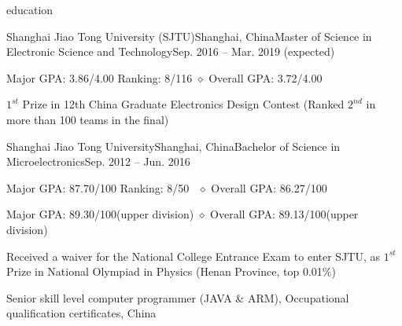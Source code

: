 \documentclass{resume_ucla} %
\begin{document}

\begin{rSection}{education}
\begin{rSubsection}{Shanghai Jiao Tong University (SJTU)}{Shanghai, China}{Master of Science in Electronic Science and Technology}{Sep. 2016 -- Mar. 2019 (expected)}
\item Major GPA: 3.86/4.00 \qquad Ranking: 8/116 \qquad $\diamond$ Overall GPA: 3.72/4.00
\item $1^{st}$ Prize in 12th China Graduate Electronics Design Contest (Ranked $2^{nd}$ in more than 100 teams in the final)
\end{rSubsection}
\begin{rSubsection}{Shanghai Jiao Tong University}{Shanghai, China}{Bachelor of Science in Microelectronics}{Sep. 2012 -- Jun. 2016}
\item Major GPA: 87.70/100 \qquad Ranking: 8/50 \qquad \ $\diamond$ Overall GPA: 86.27/100
\item Major GPA: 89.30/100(upper division) \qquad \qquad$\diamond$ Overall GPA: 89.13/100(upper division)
\item Received a waiver for the National College Entrance Exam to enter SJTU, as $1^{st}$ Prize in National Olympiad in Physics (Henan Province, top 0.01$\%$)
\item Senior skill level computer programmer (JAVA \& ARM), Occupational qualification certificates, China
\end{rSubsection}

\begin{comment}
\textbf{Shanghai Jiao Tong University (SJTU), Shanghai}
\\\emph{Master of Science in Electronic Science and Technology} \hfill \emph{Sep. 2016 -- Mar. 2019(expected)}
\\\bm{$\diamond$} Major GPA: 3.86/4.00 \qquad Ranking: 8/116 \qquad $\diamond$ Overall GPA: 3.72/4.00
\\\bm{$\diamond$} $1^{st}$ Prize in 12th China Graduate Electronics Design Contest (Ranked $2^{nd}$ in more than 100 teams in the final)
\\\emph{Bachelor of Science in Microelectronics} \hfill \emph{Sep. 2012 -- Jun. 2016}
\\\bm{$\diamond$} Major GPA: 87.70/100 \qquad Ranking: 8/50 \qquad \ $\diamond$ Overall GPA: 86.27/100
\\\bm{$\diamond$} Major GPA: 89.30/100(upper division) \qquad \qquad$\diamond$ Overall GPA: 89.13/100(upper division)
\\\bm{$\diamond$} Received a waiver for the National College Entrance Exam to enter SJTU, as $1^{st}$ Prize in National Olympiad in Physics (Henan Province, top 0.01$\%$)
\end{comment}

\end{rSection}
\end{document}
